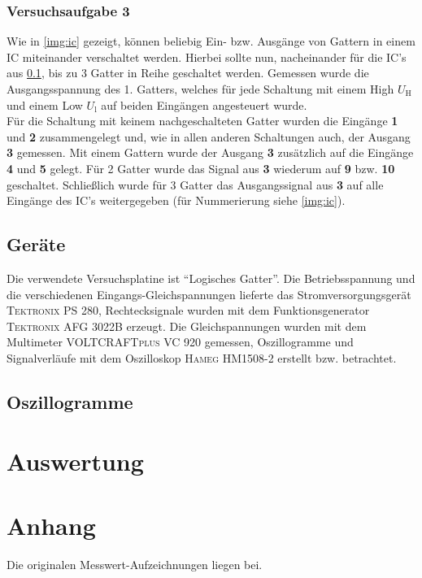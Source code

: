 \documentclass[numbers=noenddot,12pt,a4paper]{scrartcl}
\newcommand{\ix}[1]{_\text{#1}}
\begin{document}
\subsubsection{Versuchsaufgabe 3}
Wie in \ref{img:ic} gezeigt, können beliebig Ein- bzw. Ausgänge von Gattern in einem IC miteinander verschaltet werden. Hierbei sollte nun, nacheinander für die IC's aus \ref{sec:gerät}, bis zu 3 Gatter in Reihe geschaltet werden. Gemessen wurde die Ausgangsspannung des 1. Gatters, welches für jede Schaltung mit einem High $U\ix{H}$ und einem Low $U\ix{l}$ auf beiden Eingängen angesteuert wurde. \\
Für die Schaltung mit keinem nachgeschalteten Gatter wurden die Eingänge \textbf{1} und \textbf{2} zusammengelegt und, wie in allen anderen Schaltungen auch, der Ausgang \textbf{3} gemessen. Mit einem Gattern wurde der Ausgang \textbf{3} zusätzlich auf die Eingänge \textbf{4} und \textbf{5} gelegt. Für 2 Gatter wurde das Signal aus \textbf{3} wiederum auf \textbf{9} bzw. \textbf{10} geschaltet. Schließlich wurde für 3 Gatter das Ausgangssignal aus \textbf{3} auf alle Eingänge des IC's weitergegeben (für Nummerierung siehe \ref{img:ic}).
\subsection{Geräte} \label{sec:gerät}
Die verwendete Versuchsplatine ist "`Logisches Gatter"'. Die Betriebsspannung und die verschiedenen Eingangs-Gleichspannungen lieferte das Stromversorgungsgerät \textsc{Tektronix PS 280}, Rechtecksignale wurden mit dem Funktionsgenerator \textsc{Tektronix AFG 3022B} erzeugt. Die Gleichspannungen wurden mit dem Multimeter \textsc{VOLTCRAFTplus VC 920} gemessen, Oszillogramme und Signalverläufe mit dem Oszilloskop \textsc{Hameg HM1508-2} erstellt bzw. betrachtet.
\subsection{Oszillogramme}
\section{Auswertung}
\section{Anhang}
Die originalen Messwert-Aufzeichnungen liegen bei.
\end{document}
